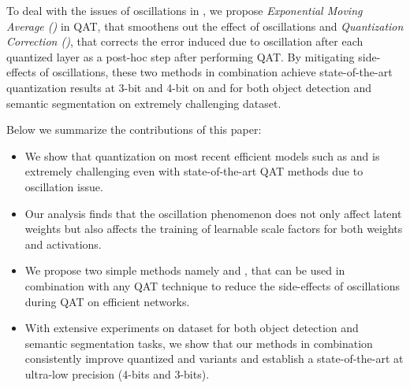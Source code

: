 To deal with the issues of oscillations in \yolo, we propose {\em Exponential Moving Average (\exma{})} in \acrshort{QAT}, that smoothens out the effect of oscillations and {\em Quantization Correction (\qc)}, that corrects the error induced due to oscillation after each quantized layer as a post-hoc step after performing \acrshort{QAT}. By mitigating side-effects of oscillations, these two methods in combination achieve state-of-the-art quantization results at 3-bit and 4-bit on \yoloa{} and \yolob{} for both object detection and semantic segmentation on extremely challenging \coco{} dataset. 

Below we summarize the contributions of this paper:
\begin{itemize}[leftmargin=*]
\item We show that quantization on most recent efficient \yolo{} models such as \yoloa{} and \yolob{} is extremely challenging even with state-of-the-art \acrshort{QAT} methods due to oscillation issue.
\item Our analysis finds that the oscillation phenomenon does not only affect latent weights but also affects the training of learnable scale factors for both weights and activations. 
\item We propose two simple methods namely \exma{} and \qc{}, that can be used in combination with any \acrshort{QAT} technique to reduce the side-effects of oscillations during \acrshort{QAT} on efficient networks. 
\item With extensive experiments on \coco{} dataset for both object detection and semantic segmentation tasks, we show that our methods in combination consistently improve quantized \yoloa{} and \yolob{} variants and establish a state-of-the-art at ultra-low precision (4-bits and 3-bits).
\end{itemize}



